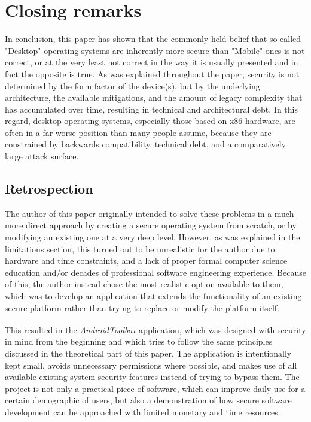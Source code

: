 \documentclass[a4paper,12pt]{report}
\begin{document}
\chapter{Closing remarks}
In conclusion, this paper has shown that the commonly held belief that so-called "Desktop" operating systems are inherently more secure than "Mobile" ones is not correct, or at the very least not correct in the way it is usually presented and in fact the opposite is true. As was explained throughout the paper, security is not determined by the form factor of the device(s), but by the underlying architecture, the available mitigations, and the amount of legacy complexity that has accumulated over time, resulting in technical and architectural debt. In this regard, desktop operating systems, especially those based on x86 hardware, are often in a far worse position than many people assume, because they are constrained by backwards compatibility, technical debt, and a comparatively large attack surface.

\section{Retrospection}
The author of this paper originally intended to solve these problems in a much more direct approach by creating a secure operating system from scratch, or by modifying an existing one at a very deep level. However, as was explained in the limitations section, this turned out to be unrealistic for the author due to hardware and time constraints, and a lack of proper formal computer science education and/or decades of professional software engineering experience. Because of this, the author instead chose the most realistic option available to them, which was to develop an application that extends the functionality of an existing secure platform rather than trying to replace or modify the platform itself.

This resulted in the \textit{AndroidToolbox}\textsuperscript{\citep{androidtoolbox}} application, which was designed with security in mind from the beginning and which tries to follow the same principles discussed in the theoretical part of this paper. The application is intentionally kept small, avoids unnecessary permissions where possible, and makes use of all available existing system security features instead of trying to bypass them. The project is not only a practical piece of software, which can improve daily use for a certain demographic of users, but also a demonstration of how secure software development can be approached with limited monetary and time resources.
\end{document}
